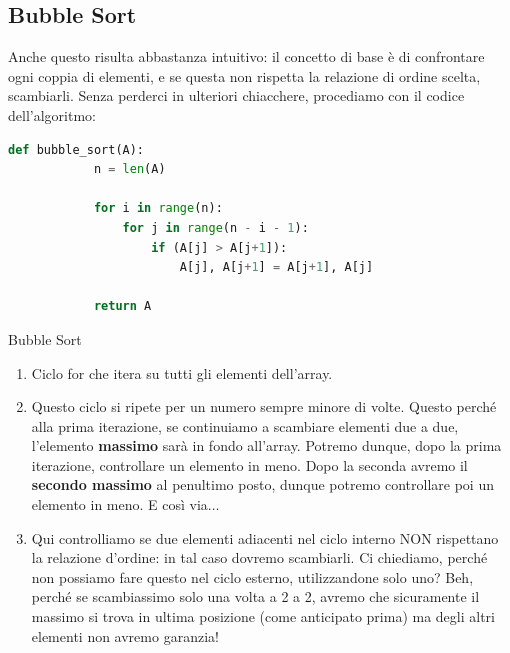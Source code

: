\documentclass[12pt]{report}
\begin{document}
	\subsection{Bubble Sort}
	Anche questo risulta abbastanza intuitivo: il concetto di base è di confrontare ogni coppia di elementi, e se questa non rispetta la relazione di ordine scelta, scambiarli.
    Senza perderci in ulteriori chiacchere, procediamo con il codice dell’algoritmo:
    		
    \begin{lstlisting}[caption={Bubble Sort}, language=Python]
    	def bubble_sort(A):
    		n = len(A)
    		
    		for i in range(n):
    			for j in range(n - i - 1):
    				if (A[j] > A[j+1]):
    					A[j], A[j+1] = A[j+1], A[j]
    					
    		return A
    \end{lstlisting}
    		
    \begin{algoritmo}{Bubble Sort}{}
    	
    	\begin{enumerate}
    		
    		\item Ciclo for che itera su tutti gli elementi dell’array.
    		
    		\item Questo ciclo si ripete per un numero sempre minore di volte. Questo perché alla prima iterazione, se continuiamo a scambiare elementi due a due, l’elemento \textbf{massimo} sarà in fondo all’array. Potremo dunque, dopo la prima iterazione, controllare un elemento in meno. Dopo la seconda avremo il \textbf{secondo massimo} al penultimo posto, dunque potremo controllare poi un elemento in meno. E così via$\dots$
    				
    		\item  Qui controlliamo se due elementi adiacenti nel ciclo interno NON rispettano la relazione d’ordine: in tal caso dovremo scambiarli. Ci chiediamo, perché non possiamo fare questo nel ciclo esterno, utilizzandone solo uno? Beh, perché se scambiassimo solo una volta a 2 a 2, avremo che sicuramente il massimo si trova in ultima posizione (come anticipato prima) ma degli altri elementi non avremo garanzia!
    				
    	\end{enumerate}
    			
    \end{algoritmo}
    		
\end{document}
